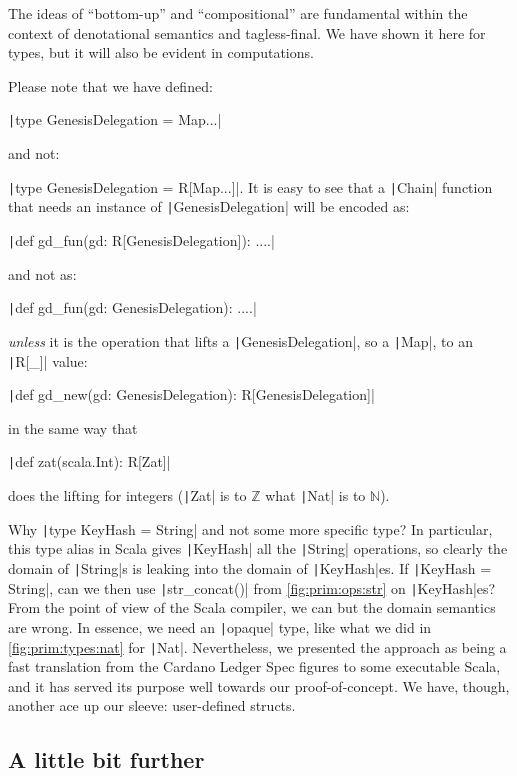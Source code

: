 \documentclass[11pt]{article}
\renewcommand{\vref}[1]{\autoref{#1} \vpageref{#1}}{}
\newcommand{\ScalaI}[1]{\texttt|#1|}
\begin{document}
\noindent The ideas of ``bottom-up'' and ``compositional'' are fundamental 
within the context of denotational semantics and tagless-final. We have shown 
it here for types, but it will also be evident in computations.

Please note that we have defined:

\ScalaI{type GenesisDelegation = Map...}

\noindent and not:

\ScalaI{type GenesisDelegation = R[Map...]}. It is easy to see that a 
\ScalaI{Chain} function that needs an instance of \ScalaI{GenesisDelegation} 
will be encoded as:

\ScalaI{def gd_fun(gd: R[GenesisDelegation]): ....}

\noindent and not as:

\ScalaI{def gd_fun(gd: GenesisDelegation): ....}

\noindent \textit{unless} it is the operation that lifts a 
\ScalaI{GenesisDelegation}, so a \ScalaI{Map}, to an \ScalaI{R[_]} value:

\ScalaI{def gd_new(gd: GenesisDelegation): R[GenesisDelegation]}

\noindent in the same way that

\ScalaI{def zat(scala.Int): R[Zat]}

\noindent does the lifting for integers (\ScalaI{Zat} is to $\mathbb{Z}$ what 
\ScalaI{Nat} is to $\mathbb{N}$).

Why \ScalaI{type KeyHash = String} and not some more specific type? In 
particular, this type alias in Scala gives \ScalaI{KeyHash} all the 
\ScalaI{String} operations, so clearly the domain of \ScalaI{String}s is 
leaking into the domain of \ScalaI{KeyHash}es. If \ScalaI{KeyHash = String}, 
can we then use \ScalaI{str_concat()} from \autoref{fig:prim:ops:str} on 
\ScalaI{KeyHash}es? From the point of view of the Scala compiler, we can but 
the domain semantics are wrong. In essence, we need an \ScalaI{opaque} type, 
like what we did in \vref{fig:prim:types:nat} for \ScalaI{Nat}. Nevertheless, 
we presented the approach as being a fast translation from the Cardano Ledger 
Spec figures to some executable Scala, and it has served its purpose well 
towards our proof-of-concept. We have, though, another ace up our sleeve: 
user-defined structs.

\subsection{A little bit further}
\label{sec:chain:further}
\end{document}
